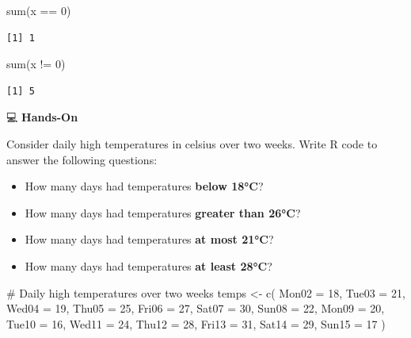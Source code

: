 \documentclass[
  letterpaper,
  DIV=11,
  numbers=noendperiod]{scrreprt}
\newenvironment{Shaded}{\begin{snugshade}}{\end{snugshade}}
\newcommand{\AttributeTok}[1]{\textcolor[rgb]{0.40,0.45,0.13}{#1}}
\newcommand{\CommentTok}[1]{\textcolor[rgb]{0.37,0.37,0.37}{#1}}
\newcommand{\DecValTok}[1]{\textcolor[rgb]{0.68,0.00,0.00}{#1}}
\newcommand{\FunctionTok}[1]{\textcolor[rgb]{0.28,0.35,0.67}{#1}}
\newcommand{\NormalTok}[1]{\textcolor[rgb]{0.00,0.23,0.31}{#1}}
\newcommand{\OtherTok}[1]{\textcolor[rgb]{0.00,0.23,0.31}{#1}}
\newcommand{\SpecialCharTok}[1]{\textcolor[rgb]{0.37,0.37,0.37}{#1}}
\begin{document}
\begin{tcolorbox}
\begin{Shaded}
\begin{Highlighting}[]
\FunctionTok{sum}\NormalTok{(x }\SpecialCharTok{==} \DecValTok{0}\NormalTok{)}
\end{Highlighting}
\end{Shaded}

\begin{verbatim}
[1] 1
\end{verbatim}

\begin{Shaded}
\begin{Highlighting}[]
\FunctionTok{sum}\NormalTok{(x }\SpecialCharTok{!=} \DecValTok{0}\NormalTok{)}
\end{Highlighting}
\end{Shaded}

\begin{verbatim}
[1] 5
\end{verbatim}

\end{tcolorbox}

💻 \textbf{Hands-On}

Consider daily high temperatures in celsius over two weeks. Write R code
to answer the following questions:

\begin{itemize}
\item
  How many days had temperatures \textbf{below 18°C}?
\item
  How many days had temperatures \textbf{greater than 26°C}?
\item
  How many days had temperatures \textbf{at most 21°C}?
\item
  How many days had temperatures \textbf{at least 28°C}?
\end{itemize}

\begin{Shaded}
\begin{Highlighting}[]
\CommentTok{\# Daily high temperatures over two weeks}
\NormalTok{temps }\OtherTok{\textless{}{-}} \FunctionTok{c}\NormalTok{(}
  \AttributeTok{Mon02 =} \DecValTok{18}\NormalTok{, }\AttributeTok{Tue03 =} \DecValTok{21}\NormalTok{, }\AttributeTok{Wed04 =} \DecValTok{19}\NormalTok{, }\AttributeTok{Thu05 =} \DecValTok{25}\NormalTok{, }\AttributeTok{Fri06 =} \DecValTok{27}\NormalTok{, }\AttributeTok{Sat07 =} \DecValTok{30}\NormalTok{, }\AttributeTok{Sun08 =} \DecValTok{22}\NormalTok{, }
  \AttributeTok{Mon09 =} \DecValTok{20}\NormalTok{, }\AttributeTok{Tue10 =} \DecValTok{16}\NormalTok{, }\AttributeTok{Wed11 =} \DecValTok{24}\NormalTok{, }\AttributeTok{Thu12 =} \DecValTok{28}\NormalTok{, }\AttributeTok{Fri13 =} \DecValTok{31}\NormalTok{, }\AttributeTok{Sat14 =} \DecValTok{29}\NormalTok{, }\AttributeTok{Sun15 =} \DecValTok{17}
\NormalTok{)}
\end{Highlighting}
\end{Shaded}
\end{document}

